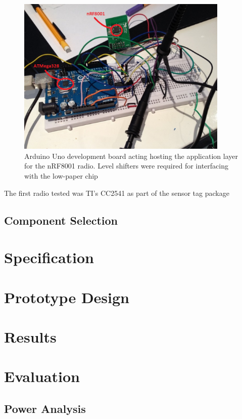 \documentclass[]{article}
\begin{document}
{\begin{figure}[htb]
	\begin{center}
		\includegraphics[width = 0.9\textwidth]{nrf8001}
	\end{center}
	\caption{Arduino Uno development board acting hosting the application layer for the nRF8001 radio. Level shifters were required for interfacing with the low-paper chip}
	\label{fig:nrf8001}
\end{figure}

The first radio tested was \ac{TI}'s CC2541 as part of the sensor tag package 
\subsection{Component Selection}

\section{Specification}

\section{Prototype Design}

\section{Results}

\section{Evaluation}

\subsection{Power Analysis}

}
\end{document}
